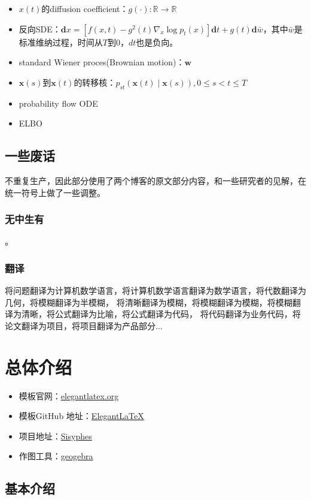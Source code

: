 \documentclass[lang=cn,newtx,10pt,scheme=chinese]{elegantbook}
\begin{document}
\begin{itemize}
    \item $x(t)$的diffusion coefficient：$g(\cdot):\mathbb{R} \rightarrow \mathbb{R}$
    \item 反向SDE：$\mathbf{d} x=\left[f(x, t)-g^2(t) \nabla_x \log p_t(x)\right] \mathbf{d} t+g(t) \mathbf{d} \bar{w}$，其中$\bar{w}$是标准维纳过程，时间从$T$到$0$，$dt$也是负向。
    \item standard Wiener proces(Brownian motion)：$\boldsymbol{w}$
    \item $\mathbf{x}(s)$到$\mathbf{x}(t)$的转移核：$p_{s t}(\mathbf{x}(t) \mid \mathbf{x}(s)),0 \leqslant s<t \leqslant T$
    \item probability flow ODE
    \item ELBO 

\end{itemize}
\section{一些废话}
不重复生产，因此部分使用了两个博客的原文部分内容，和一些研究者的见解，在统一符号上做了一些调整。
\subsection{无中生有}
。
\subsection{翻译}
将问题翻译为计算机数学语言，将计算机数学语言翻译为数学语言，将代数翻译为几何，将模糊翻译为半模糊，
将清晰翻译为模糊，将模糊翻译为模糊，将模糊翻译为清晰，将公式翻译为比喻，将公式翻译为代码，
将代码翻译为业务代码，将论文翻译为项目，将项目翻译为产品部分...

\chapter{总体介绍}

\begin{itemize}
  \item 模板官网：\href{https://elegantlatex.org/}{elegantlatex.org}
  \item 模板GitHub 地址：\href{https://github.com/ElegantLaTeX/}{ElegantLaTeX}
  \item 项目地址：\href{https://github.com/foocker}{Sisyphes}
  \item 作图工具：\href{https://www.geogebra.org/?lang=en}{geogebra}
\end{itemize}

\section{基本介绍}
\end{document}
